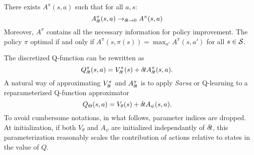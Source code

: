 
  \begin{theorem}
    There exists $A^\pi(s, a)$ such that for all $a, s$:
    \begin{equation}
      A^\pi_{\delta\hspace{-.1em}t}(s, a) \rightarrow_{{\delta\hspace{-.1em}t} \rightarrow 0} A^\pi(s, a)
    \end{equation}
    Moreover, $A^\pi$ contains all the necessary information for policy improvement. The policy $\pi$ optimal if and only if $A^\pi(s, \pi(s)) = \max_{a'}A^\pi(s, a')$ for all $s \in {\cal S}$.
  \end{theorem}

The discretized Q-function can be rewritten as
\begin{equation}
	Q^\pi_{\delta\hspace{-.1em}t}(s, a) = V^\pi_{\delta\hspace{-.1em}t}(s) + {\delta\hspace{-.1em}t} A^\pi_{\delta\hspace{-.1em}t}(s, a).
	\label{eq:reparam_q_pi}
\end{equation}
A natural way of approximating $V^\pi_{\delta\hspace{-.1em}t}$ and $A^\pi_{\delta\hspace{-.1em}t}$ is to apply
\emph{Sarsa} or Q-learning to a reparameterized Q-function approximator
\begin{equation}
	Q_\Theta(s, a) = V_{\theta}(s) + {\delta\hspace{-.1em}t} A_{\psi}(s, a).
\end{equation}
To avoid cumbersome notations, in what follows, parameter indices are dropped.
At initialization, if both $V_{\theta}$ and $A_{\psi}$ are initialized
independantly of ${\delta\hspace{-.1em}t}$, this parameterization reasonably scales the
contribution of actions relative to states in the value of $Q$.  

